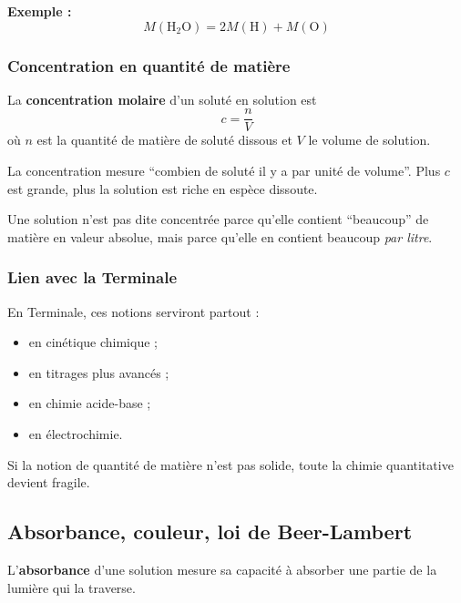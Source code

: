 \documentclass[11pt,a4paper]{article}
\begin{document}
\textbf{Exemple :}
\[
M(\mathrm{H_2O})=2M(\mathrm H)+M(\mathrm O)
\]

\subsubsection{Concentration en quantité de matière}

\begin{definitionbox}
La \textbf{concentration molaire} d'un soluté en solution est
\[
c=\frac{n}{V}
\]
où \(n\) est la quantité de matière de soluté dissous et \(V\) le volume de solution.
\end{definitionbox}

\begin{sensbox}
La concentration mesure ``combien de soluté il y a par unité de volume''.  
Plus \(c\) est grande, plus la solution est riche en espèce dissoute.
\end{sensbox}

\begin{attentionbox}
Une solution n'est pas dite concentrée parce qu'elle contient ``beaucoup'' de matière en valeur absolue, mais parce qu'elle en contient beaucoup \emph{par litre}.
\end{attentionbox}

\subsubsection{Lien avec la Terminale}

\begin{terminalebox}
En Terminale, ces notions serviront partout :
\begin{itemize}
    \item en cinétique chimique ;
    \item en titrages plus avancés ;
    \item en chimie acide-base ;
    \item en électrochimie.
\end{itemize}
Si la notion de quantité de matière n'est pas solide, toute la chimie quantitative devient fragile.
\end{terminalebox}

\subsection{Absorbance, couleur, loi de Beer-Lambert}

\begin{definitionbox}
L'\textbf{absorbance} d'une solution mesure sa capacité à absorber une partie de la lumière qui la traverse.
\end{definitionbox}
\end{document}
